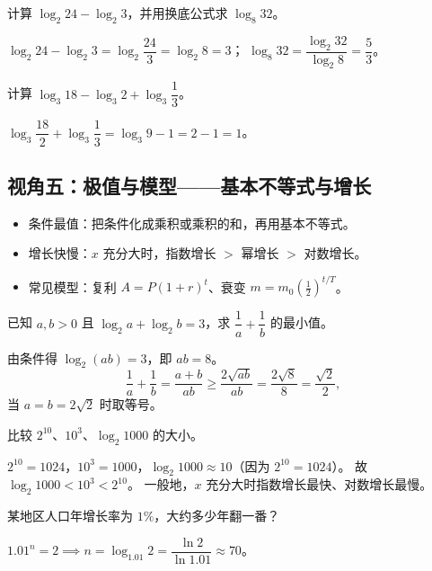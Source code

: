 \begin{explore}
\begin{example}
计算 $\log_2 24-\log_2 3$，并用换底公式求 $\log_8 32$。
\end{example}
\begin{solution}
$\log_2 24-\log_2 3=\log_2\dfrac{24}{3}=\log_2 8=3$；
$\log_8 32=\dfrac{\log_2 32}{\log_2 8}=\dfrac53$。
\end{solution}

\begin{problem}
计算 $\log_3 18-\log_3 2+\log_3\dfrac13$。
\end{problem}
\begin{solution}
$\log_3\dfrac{18}{2}+\log_3\dfrac13=\log_3 9-1=2-1=1$。
\end{solution}

\subsection{视角五：极值与模型——基本不等式与增长}

  \begin{itemize}
  \item 条件最值：把条件化成乘积或乘积的和，再用基本不等式。
  \item 增长快慢：$x$ 充分大时，指数增长 $>$ 幂增长 $>$ 对数增长。
  \item 常见模型：复利 $A=P(1+r)^t$、衰变 $m=m_0\left(\frac12\right)^{t/T}$。
\end{itemize}

\begin{example}
已知 $a,b>0$ 且 $\log_2 a+\log_2 b=3$，求 $\dfrac1a+\dfrac1b$ 的最小值。
\end{example}
\begin{solution}
由条件得 $\log_2(ab)=3$，即 $ab=8$。
\[
  \frac1a+\frac1b=\frac{a+b}{ab}\geq\frac{2\sqrt{ab}}{ab}
  =\frac{2\sqrt8}{8}=\frac{\sqrt2}{2},
\]
当 $a=b=2\sqrt2$ 时取等号。
\end{solution}

\begin{example}
比较 $2^{10}$、$10^3$、$\log_2 1000$ 的大小。
\end{example}
\begin{solution}
$2^{10}=1024$，$10^3=1000$，$\log_2 1000\approx10$（因为 $2^{10}=1024$）。
故 $\log_2 1000<10^3<2^{10}$。
一般地，$x$ 充分大时指数增长最快、对数增长最慢。
\end{solution}

\begin{problem}
某地区人口年增长率为 $1\%$，大约多少年翻一番？
\end{problem}
\begin{solution}
$1.01^n=2\implies n=\log_{1.01}2=\dfrac{\ln2}{\ln1.01}\approx70$。
\end{solution}
\end{explore}

